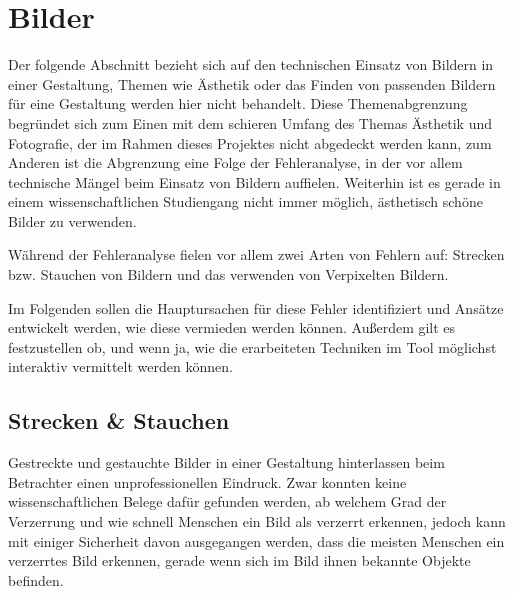 
\chapter{Bilder} %

\label{Bilder} %



Der folgende Abschnitt bezieht sich auf den technischen Einsatz von Bildern in einer Gestaltung, Themen wie Ästhetik oder das Finden von passenden Bildern für eine Gestaltung werden hier nicht behandelt.
Diese Themenabgrenzung begründet sich zum Einen mit dem schieren Umfang des Themas Ästhetik und Fotografie, der im Rahmen dieses Projektes nicht abgedeckt werden kann, zum Anderen ist die Abgrenzung eine Folge der Fehleranalyse, in der vor allem technische Mängel beim Einsatz von Bildern auffielen. Weiterhin ist es gerade in einem wissenschaftlichen Studiengang nicht immer möglich, ästhetisch schöne Bilder zu verwenden.

Während der Fehleranalyse fielen vor allem zwei Arten von Fehlern auf: Strecken bzw. Stauchen von Bildern und das verwenden von Verpixelten Bildern.

Im Folgenden sollen die Hauptursachen für diese Fehler identifiziert und Ansätze entwickelt werden, wie diese vermieden werden können. Außerdem gilt es festzustellen ob, und wenn ja, wie die erarbeiteten Techniken im Tool möglichst interaktiv vermittelt werden können.

\section{Strecken \& Stauchen}
Gestreckte und gestauchte Bilder in einer Gestaltung hinterlassen beim Betrachter einen unprofessionellen Eindruck.
Zwar konnten keine wissenschaftlichen Belege dafür gefunden werden, ab welchem Grad der Verzerrung und wie schnell Menschen ein Bild als verzerrt erkennen, jedoch kann mit einiger Sicherheit davon ausgegangen werden, dass die meisten Menschen ein verzerrtes Bild erkennen, gerade wenn sich im Bild ihnen bekannte Objekte befinden.

